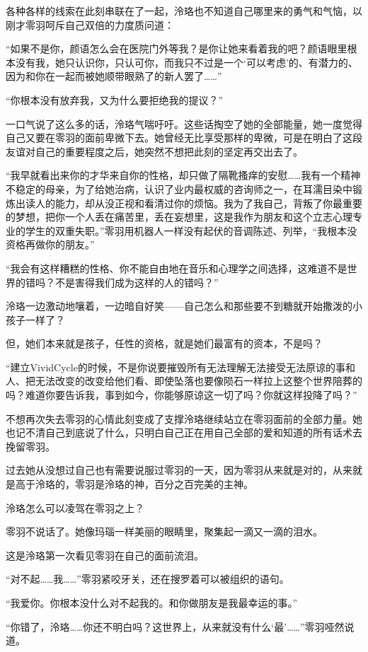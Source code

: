 \documentclass[UTF8, scheme = chinese, openany]{ctexbook}
\begin{document}
各种各样的线索在此刻串联在了一起，泠珞也不知道自己哪里来的勇气和气恼，以刚才零羽呵斥自己双倍的力度质问道：

“如果不是你，颜语怎么会在医院门外等我？是你让她来看着我的吧？颜语眼里根本没有我，她只认识你，只认可你，而我只不过是一个‘可以考虑’的、有潜力的、因为和你在一起而被她顺带眼熟了的新人罢了……”

“你根本没有放弃我，又为什么要拒绝我的提议？”

一口气说了这么多的话，泠珞气喘吁吁。这些话掏空了她的全部能量，她一度觉得自己又要在零羽的面前卑微下去。她曾经无比享受那样的卑微，可是在明白了这段友谊对自己的重要程度之后，她突然不想把此刻的坚定再交出去了。

“我早就看出来你的才华来自你的性格，却只做了隔靴搔痒的安慰……我有一个精神不稳定的母亲，为了给她治病，认识了业内最权威的咨询师之一，在耳濡目染中锻炼出读人的能力，却从没正视和看清过你的烦恼。我为了我自己，背叛了你最重要的梦想，把你一个人丢在痛苦里，丢在妄想里，这是我作为朋友和这个立志心理专业的学生的双重失职。”零羽用机器人一样没有起伏的音调陈述、列举，“我根本没资格再做你的朋友。”

“我会有这样糟糕的性格、你不能自由地在音乐和心理学之间选择，这难道不是世界的错吗？不是害得我们成为这样的人的错吗？”

泠珞一边激动地嚷着，一边暗自好笑——自己怎么和那些要不到糖就开始撒泼的小孩子一样了？

但，她们本来就是孩子，任性的资格，就是她们最富有的资本，不是吗？

“建立VividCycle的时候，不是你说要摧毁所有无法理解无法接受无法原谅的事和人、把无法改变的改变给他们看、即使坠落也要像陨石一样拉上这整个世界陪葬的吗？难道你要告诉我，事到如今，你能够原谅这一切了吗？你就这样投降了吗？”

不想再次失去零羽的心情此刻变成了支撑泠珞继续站立在零羽面前的全部力量。她也记不清自己到底说了什么，只明白自己正在用自己全部的爱和知道的所有话术去挽留零羽。

过去她从没想过自己也有需要说服过零羽的一天，因为零羽从来就是对的，从来就是高于泠珞的，零羽是泠珞的神，百分之百完美的主神。

泠珞怎么可以凌驾在零羽之上？

零羽不说话了。她像玛瑙一样美丽的眼睛里，聚集起一滴又一滴的泪水。

这是泠珞第一次看见零羽在自己的面前流泪。

“对不起……我……”零羽紧咬牙关，还在搜罗着可以被组织的语句。

“我爱你。你根本没什么对不起我的。和你做朋友是我最幸运的事。”

“你错了，泠珞……你还不明白吗？这世界上，从来就没有什么‘最’……”零羽哑然说道。
\end{document}
